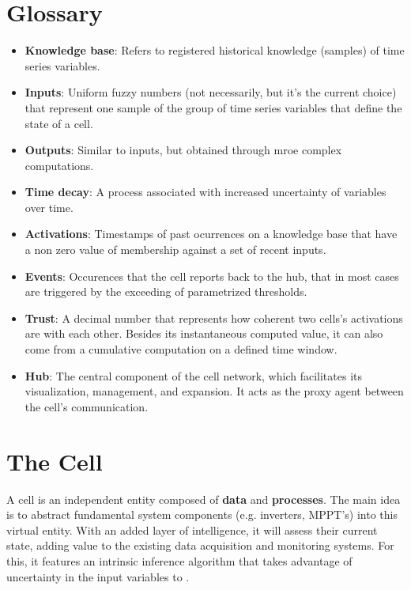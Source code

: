\section{Glossary} \label{sec:glossary}


\begin{itemize}
    \item \textbf{Knowledge base}: Refers to registered historical knowledge (samples) of time series variables.
    
    \item \textbf{Inputs}: Uniform fuzzy numbers (not necessarily, but it's the current choice) that represent one sample of the group of time series variables that define the state of a cell.

    \item \textbf{Outputs}: Similar to inputs, but obtained through mroe complex computations.

    \item \textbf{Time decay}: A process associated with increased uncertainty of variables over time.
    
    \item \textbf{Activations}: Timestamps of past ocurrences on a knowledge base that have a non zero value of membership against a set of recent inputs.
    
    \item \textbf{Events}: Occurences that the cell reports back to the hub, that in most cases are triggered by the exceeding of parametrized thresholds.
    
    \item \textbf{Trust}: A decimal number that represents how coherent two cells's activations are with each other. Besides its instantaneous computed value, it can also come from a cumulative computation on a defined time window.

    \item \textbf{Hub}: The central component of the cell network, which facilitates its visualization, management, and expansion. It acts as the proxy agent between the cell's communication.
    
\end{itemize}

\section{The Cell} \label{sec:thecell}

A cell is an independent entity composed of \textbf{data} and \textbf{processes}. The main idea is to abstract fundamental system components (e.g. inverters, MPPT's) into this virtual entity. With an added layer of intelligence, it will assess their current state, adding value to the existing data acquisition and monitoring systems.
For this, it features an intrinsic inference algorithm that takes advantage of uncertainty in the input variables to . 

